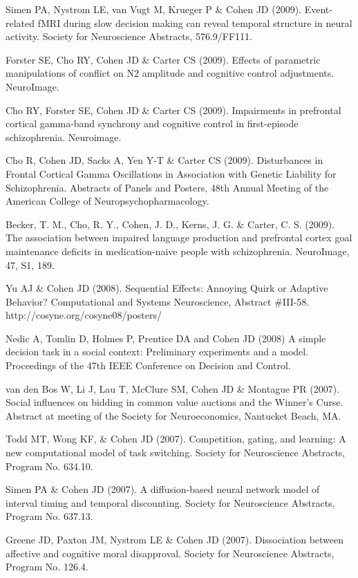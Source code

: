 \documentclass[10 pt]{article}
\begin{document}
Simen PA, Nystrom LE, van Vugt M, Krueger P \& Cohen JD (2009). Event-related fMRI during slow decision making can reveal temporal structure in neural activity. Society for Neuroscience Abstracts, 576.9/FF111.

Forster SE, Cho RY, Cohen JD \& Carter CS (2009). Effects of parametric manipulations of conflict on N2 amplitude and cognitive control adjustments. NeuroImage.

Cho RY, Forster SE, Cohen JD \& Carter CS (2009). Impairments in prefrontal cortical gamma-band synchrony and cognitive control in first-episode schizophrenia. Neuroimage.

Cho R, Cohen JD, Sacks A, Yen Y-T \& Carter CS (2009). Disturbances in Frontal Cortical Gamma Oscillations in Association with Genetic Liability for Schizophrenia. Abstracts of Panels and
Posters, 48th Annual Meeting of the American College of Neuropsychopharmacology.

Becker, T. M., Cho, R. Y., Cohen, J. D., Kerns, J. G. \& Carter, C. S. (2009). The association between impaired language production and prefrontal cortex goal maintenance deficits in medication-naive people with schizophrenia. NeuroImage, 47, S1, 189.

Yu AJ \& Cohen JD (2008). Sequential Effects: Annoying Quirk or Adaptive Behavior? Computational
and Systems Neuroscience, Abstract #III-58. http://cosyne.org/cosyne08/posters/

Nedic A, Tomlin D, Holmes P, Prentice DA and Cohen JD (2008) A simple decision task in a social context: Preliminary experiments and a model. Proceedings of the 47th IEEE Conference on Decision and Control.

van den Bos W, Li J, Lau T, McClure SM, Cohen JD \& Montague PR (2007). Social influences on bidding in common value auctions and the Winner’s Curse. Abstract at meeting of the Society for
Neuroeconomics, Nantucket Beach, MA.

Todd MT, Wong KF, \& Cohen JD (2007). Competition, gating, and learning: A new computational model of task switching. Society for Neuroscience Abstracts, Program No. 634.10.

Simen PA \& Cohen JD (2007). A diffusion-based neural network model of interval timing and temporal discounting. Society for Neuroscience Abstracts, Program No. 637.13.

Greene JD, Paxton JM, Nystrom LE \& Cohen JD (2007). Dissociation between affective and cognitive moral disapproval. Society for Neuroscience Abstracts, Program No. 126.4.
\end{document}

